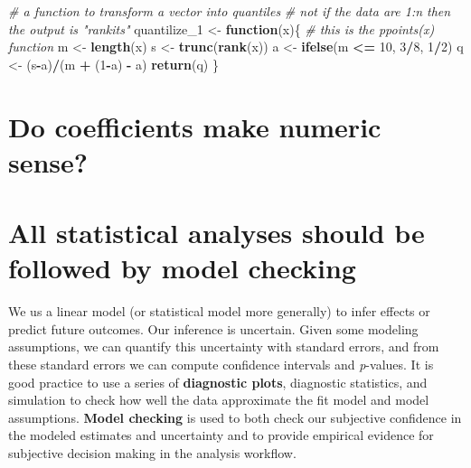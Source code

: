 \documentclass[]{book}
\newenvironment{Shaded}{\begin{snugshade}}{\end{snugshade}}
\newcommand{\KeywordTok}[1]{\textcolor[rgb]{0.13,0.29,0.53}{\textbf{#1}}}
\newcommand{\DecValTok}[1]{\textcolor[rgb]{0.00,0.00,0.81}{#1}}
\newcommand{\StringTok}[1]{\textcolor[rgb]{0.31,0.60,0.02}{#1}}
\newcommand{\CommentTok}[1]{\textcolor[rgb]{0.56,0.35,0.01}{\textit{#1}}}
\newcommand{\ControlFlowTok}[1]{\textcolor[rgb]{0.13,0.29,0.53}{\textbf{#1}}}
\newcommand{\OperatorTok}[1]{\textcolor[rgb]{0.81,0.36,0.00}{\textbf{#1}}}
\newcommand{\NormalTok}[1]{#1}
\begin{document}
\begin{Shaded}
\begin{Highlighting}[]
\CommentTok{# a function to transform a vector into quantiles}
\CommentTok{# not if the data are 1:n then the output is "rankits"}
\NormalTok{quantilize_}\DecValTok{1}\NormalTok{ <-}\StringTok{ }\ControlFlowTok{function}\NormalTok{(x)\{}
  \CommentTok{# this is the ppoints(x) function}
\NormalTok{  m <-}\StringTok{ }\KeywordTok{length}\NormalTok{(x)}
\NormalTok{  s <-}\StringTok{ }\KeywordTok{trunc}\NormalTok{(}\KeywordTok{rank}\NormalTok{(x))}
\NormalTok{  a <-}\StringTok{ }\KeywordTok{ifelse}\NormalTok{(m }\OperatorTok{<=}\StringTok{ }\DecValTok{10}\NormalTok{, }\DecValTok{3}\OperatorTok{/}\DecValTok{8}\NormalTok{, }\DecValTok{1}\OperatorTok{/}\DecValTok{2}\NormalTok{)}
\NormalTok{  q <-}\StringTok{ }\NormalTok{(s}\OperatorTok{-}\NormalTok{a)}\OperatorTok{/}\NormalTok{(m }\OperatorTok{+}\StringTok{ }\NormalTok{(}\DecValTok{1}\OperatorTok{-}\NormalTok{a) }\OperatorTok{-}\StringTok{ }\NormalTok{a)}
  \KeywordTok{return}\NormalTok{(q)}
\NormalTok{\}}
\end{Highlighting}
\end{Shaded}

\section{Do coefficients make numeric
sense?}\label{do-coefficients-make-numeric-sense}

\section{All statistical analyses should be followed by model
checking}\label{all-statistical-analyses-should-be-followed-by-model-checking}

We us a linear model (or statistical model more generally) to infer
effects or predict future outcomes. Our inference is uncertain. Given
some modeling assumptions, we can quantify this uncertainty with
standard errors, and from these standard errors we can compute
confidence intervals and \emph{p}-values. It is good practice to use a
series of \textbf{diagnostic plots}, diagnostic statistics, and
simulation to check how well the data approximate the fit model and
model assumptions. \textbf{Model checking} is used to both check our
subjective confidence in the modeled estimates and uncertainty and to
provide empirical evidence for subjective decision making in the
analysis workflow.
\end{document}
